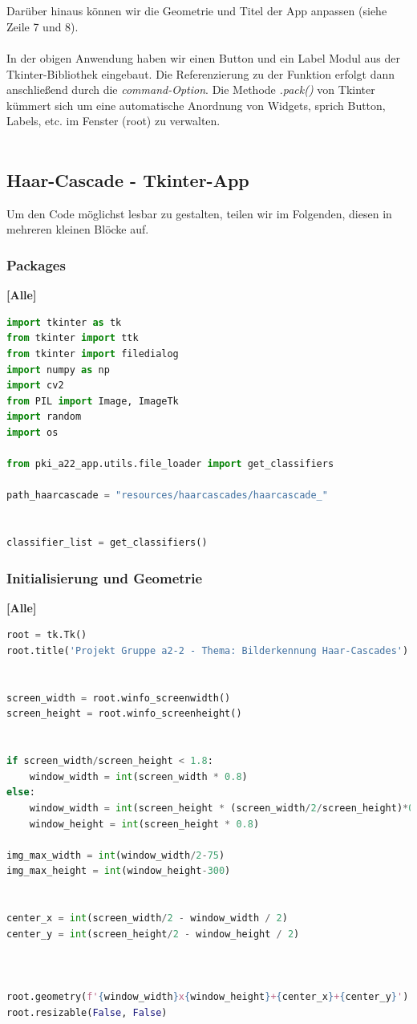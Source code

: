 \documentclass{article}
\begin{document}
\\ \\
Darüber hinaus können wir die Geometrie und Titel der App anpassen (siehe Zeile 7 und 8). 
\\ \\
In der obigen Anwendung haben wir einen Button und ein Label Modul aus der Tkinter-Bibliothek eingebaut. Die Referenzierung zu der Funktion erfolgt dann anschließend durch die \textit{command-Option}. Die Methode \textit{.pack()} von Tkinter kümmert sich um eine automatische Anordnung von Widgets, sprich Button, Labels, etc. im Fenster (root) zu verwalten.
\ \\ \\
\subsection{Haar-Cascade - Tkinter-App}
Um den Code möglichst lesbar zu gestalten, teilen wir im Folgenden, diesen in mehreren kleinen Blöcke auf.
\subsubsection{Packages}
\textbf{[Alle]}
\begin{lstlisting}[language=Python, label = {lst:code}, mathescape= true]
import tkinter as tk
from tkinter import ttk
from tkinter import filedialog
import numpy as np
import cv2
from PIL import Image, ImageTk
import random
import os

from pki_a22_app.utils.file_loader import get_classifiers

path_haarcascade = "resources/haarcascades/haarcascade_"


classifier_list = get_classifiers()
\end{lstlisting}


\subsubsection{Initialisierung und Geometrie}
\textbf{[Alle]}
\begin{lstlisting}[language=Python]
root = tk.Tk()
root.title('Projekt Gruppe a2-2 - Thema: Bilderkennung Haar-Cascades')


screen_width = root.winfo_screenwidth()
screen_height = root.winfo_screenheight()


if screen_width/screen_height < 1.8:
	window_width = int(screen_width * 0.8)
else: 
	window_width = int(screen_height * (screen_width/2/screen_height)*0.8)
	window_height = int(screen_height * 0.8)

img_max_width = int(window_width/2-75)
img_max_height = int(window_height-300) 


center_x = int(screen_width/2 - window_width / 2)
center_y = int(screen_height/2 - window_height / 2)



root.geometry(f'{window_width}x{window_height}+{center_x}+{center_y}')
root.resizable(False, False)
\end{lstlisting}
\end{document}
